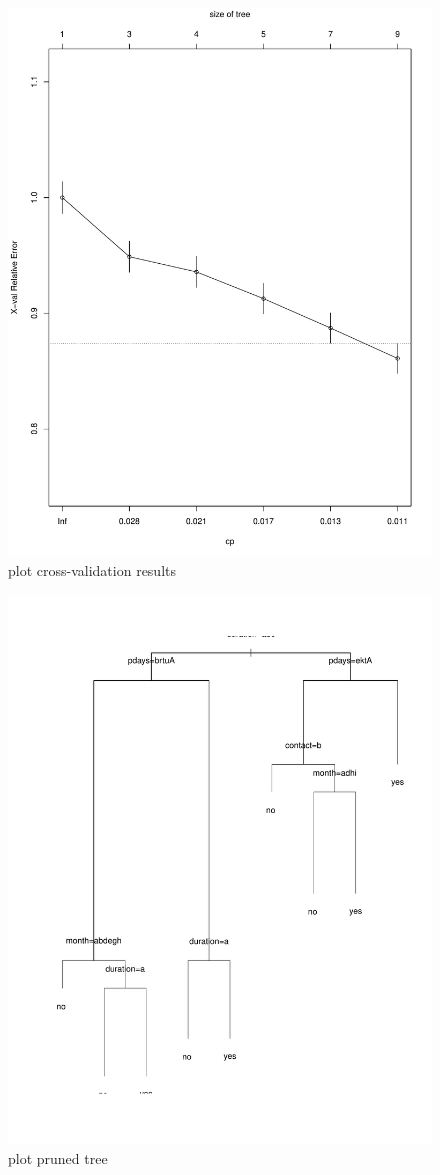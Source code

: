 \documentclass[12pt, a4paper, bibliography=totoc, english]{scrartcl}
\begin{document}
\begin{figure}
	\centering
	\includegraphics[width=0.7\linewidth]{plot_cp}
	\caption{plot cross-validation results}
	\label{fig:plotcp}
\end{figure}
\begin{figure}
	\centering
	\includegraphics[width=0.7\linewidth]{plot_pruned_dt}
	\caption{plot pruned tree}
	\label{fig:plotpruneddt}
\end{figure}
\end{document}

